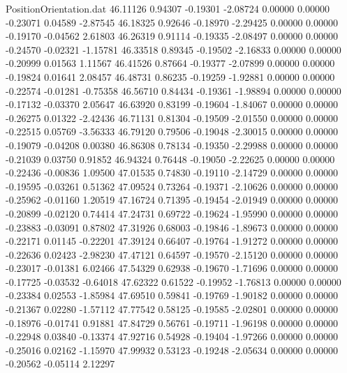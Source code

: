 \begin{filecontents}{PositionOrientation.dat}
  46.11126    0.94307   -0.19301    -2.08724    0.00000    0.00000   -0.23071    0.04589   -2.87545
  46.18325    0.92646   -0.18970    -2.29425    0.00000    0.00000   -0.19170   -0.04562    2.61803
  46.26319    0.91114   -0.19335    -2.08497    0.00000    0.00000   -0.24570   -0.02321   -1.15781
  46.33518    0.89345   -0.19502    -2.16833    0.00000    0.00000   -0.20999    0.01563    1.11567
  46.41526    0.87664   -0.19377    -2.07899    0.00000    0.00000   -0.19824    0.01641    2.08457
  46.48731    0.86235   -0.19259    -1.92881    0.00000    0.00000   -0.22574   -0.01281   -0.75358
  46.56710    0.84434   -0.19361    -1.98894    0.00000    0.00000   -0.17132   -0.03370    2.05647
  46.63920    0.83199   -0.19604    -1.84067    0.00000    0.00000   -0.26275    0.01322   -2.42436
  46.71131    0.81304   -0.19509    -2.01550    0.00000    0.00000   -0.22515    0.05769   -3.56333
  46.79120    0.79506   -0.19048    -2.30015    0.00000    0.00000   -0.19079   -0.04208    0.00380
  46.86308    0.78134   -0.19350    -2.29988    0.00000    0.00000   -0.21039    0.03750    0.91852
  46.94324    0.76448   -0.19050    -2.22625    0.00000    0.00000   -0.22436   -0.00836    1.09500
  47.01535    0.74830   -0.19110    -2.14729    0.00000    0.00000   -0.19595   -0.03261    0.51362
  47.09524    0.73264   -0.19371    -2.10626    0.00000    0.00000   -0.25962   -0.01160    1.20519
  47.16724    0.71395   -0.19454    -2.01949    0.00000    0.00000   -0.20899   -0.02120    0.74414
  47.24731    0.69722   -0.19624    -1.95990    0.00000    0.00000   -0.23883   -0.03091    0.87802
  47.31926    0.68003   -0.19846    -1.89673    0.00000    0.00000   -0.22171    0.01145   -0.22201
  47.39124    0.66407   -0.19764    -1.91272    0.00000    0.00000   -0.22636    0.02423   -2.98230
  47.47121    0.64597   -0.19570    -2.15120    0.00000    0.00000   -0.23017   -0.01381    6.02466
  47.54329    0.62938   -0.19670    -1.71696    0.00000    0.00000   -0.17725   -0.03532   -0.64018
  47.62322    0.61522   -0.19952    -1.76813    0.00000    0.00000   -0.23384    0.02553   -1.85984
  47.69510    0.59841   -0.19769    -1.90182    0.00000    0.00000   -0.21367    0.02280   -1.57112
  47.77542    0.58125   -0.19585    -2.02801    0.00000    0.00000   -0.18976   -0.01741    0.91881
  47.84729    0.56761   -0.19711    -1.96198    0.00000    0.00000   -0.22948    0.03840   -0.13374
  47.92716    0.54928   -0.19404    -1.97266    0.00000    0.00000   -0.25016    0.02162   -1.15970
  47.99932    0.53123   -0.19248    -2.05634    0.00000    0.00000   -0.20562   -0.05114    2.12297

\end{filecontents}
